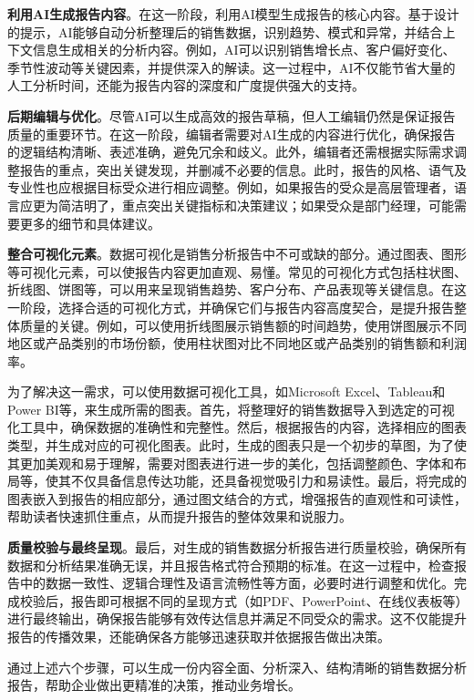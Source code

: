 \textbf{利用AI生成报告内容}。在这一阶段，利用AI模型生成报告的核心内容。基于设计的提示，AI能够自动分析整理后的销售数据，识别趋势、模式和异常，并结合上下文信息生成相关的分析内容。例如，AI可以识别销售增长点、客户偏好变化、季节性波动等关键因素，并提供深入的解读。这一过程中，AI不仅能节省大量的人工分析时间，还能为报告内容的深度和广度提供强大的支持。

\textbf{后期编辑与优化}。尽管AI可以生成高效的报告草稿，但人工编辑仍然是保证报告质量的重要环节。在这一阶段，编辑者需要对AI生成的内容进行优化，确保报告的逻辑结构清晰、表述准确，避免冗余和歧义。此外，编辑者还需根据实际需求调整报告的重点，突出关键发现，并删减不必要的信息。此时，报告的风格、语气及专业性也应根据目标受众进行相应调整。例如，如果报告的受众是高层管理者，语言应更为简洁明了，重点突出关键指标和决策建议；如果受众是部门经理，可能需要更多的细节和具体建议。

\textbf{整合可视化元素}。数据可视化是销售分析报告中不可或缺的部分。通过图表、图形等可视化元素，可以使报告内容更加直观、易懂。常见的可视化方式包括柱状图、折线图、饼图等，可以用来呈现销售趋势、客户分布、产品表现等关键信息。在这一阶段，选择合适的可视化方式，并确保它们与报告内容高度契合，是提升报告整体质量的关键。例如，可以使用折线图展示销售额的时间趋势，使用饼图展示不同地区或产品类别的市场份额，使用柱状图对比不同地区或产品类别的销售额和利润率。

为了解决这一需求，可以使用数据可视化工具，如Microsoft Excel、Tableau和Power BI等，来生成所需的图表。首先，将整理好的销售数据导入到选定的可视化工具中，确保数据的准确性和完整性。然后，根据报告的内容，选择相应的图表类型，并生成对应的可视化图表。此时，生成的图表只是一个初步的草图，为了使其更加美观和易于理解，需要对图表进行进一步的美化，包括调整颜色、字体和布局等，使其不仅具备信息传达功能，还具备视觉吸引力和易读性。最后，将完成的图表嵌入到报告的相应部分，通过图文结合的方式，增强报告的直观性和可读性，帮助读者快速抓住重点，从而提升报告的整体效果和说服力。

\textbf{质量校验与最终呈现}。最后，对生成的销售数据分析报告进行质量校验，确保所有数据和分析结果准确无误，并且报告格式符合预期的标准。在这一过程中，检查报告中的数据一致性、逻辑合理性及语言流畅性等方面，必要时进行调整和优化。完成校验后，报告即可根据不同的呈现方式（如PDF、PowerPoint、在线仪表板等）进行最终输出，确保报告能够有效传达信息并满足不同受众的需求。这不仅能提升报告的传播效果，还能确保各方能够迅速获取并依据报告做出决策。

通过上述六个步骤，可以生成一份内容全面、分析深入、结构清晰的销售数据分析报告，帮助企业做出更精准的决策，推动业务增长。

